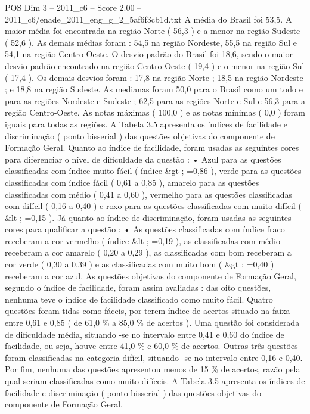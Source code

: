 \begin{textsample}{POS Dim 3 – 2011\_c6 – Score 2.00 – 2011\_c6/enade\_2011\_eng\_g\_2\_5af6f3cb1d.txt}
A média do Brasil foi 53,5.
A maior média foi encontrada na região Norte ( 56,3 ) e a menor na região Sudeste ( 52,6 ).
As demais médias foram : 54,5 na região Nordeste, 55,5 na região Sul e 54,1 na região Centro-Oeste.
O desvio padrão do Brasil foi 18,6, sendo o maior desvio padrão encontrado na região Centro-Oeste ( 19,4 ) e o menor na região Sul ( 17,4 ).
Os demais desvios foram : 17,8 na região Norte ; 18,5 na região Nordeste ; e 18,8 na região Sudeste.
As medianas foram 50,0 para o Brasil como um todo e para as regiões Nordeste e Sudeste ; 62,5 para as regiões Norte e Sul e 56,3 para a região Centro-Oeste.
As notas máximas ( 100,0 ) e as notas mínimas ( 0,0 ) foram iguais para todas as regiões.
A Tabela 3.5 apresenta os índices de facilidade e discriminação ( ponto bisserial ) das questões objetivas do componente de Formação Geral.
Quanto ao índice de facilidade, foram usadas as seguintes cores para diferenciar o nível de dificuldade da questão : • Azul para as questões classificadas com índice muito fácil ( índice \&gt ; =0,86 ), verde para as questões classificadas com índice fácil ( 0,61 a 0,85 ), amarelo para as questões classificadas com médio ( 0,41 a 0,60 ), vermelho para as questões classificadas com difícil ( 0,16 a 0,40 ) e roxo para as questões classificadas com muito difícil ( \&lt ; =0,15 ).
Já quanto ao índice de discriminação, foram usadas as seguintes cores para qualificar a questão : • As questões classificadas com índice fraco receberam a cor vermelho ( índice \&lt ; =0,19 ), as classificadas com médio receberam a cor amarelo ( 0,20 a 0,29 ), as classificadas com bom receberam a cor verde ( 0,30 a 0,39 ) e as classificadas com muito bom ( \&gt ; =0,40 ) receberam a cor azul.
As questões objetivas do componente de Formação Geral, segundo o índice de facilidade, foram assim avaliadas : das oito questões, nenhuma teve o índice de facilidade classificado como muito fácil.
Quatro questões foram tidas como fáceis, por terem índice de acertos situado na faixa entre 0,61 e 0,85 ( de 61,0 \% a 85,0 \% de acertos ).
Uma questão foi considerada de dificuldade média, situando -se no intervalo entre 0,41 e 0,60 do índice de facilidade, ou seja, houve entre 41,0 \% e 60,0 \% de acertos.
Outras três questões foram classificadas na categoria difícil, situando -se no intervalo entre 0,16 e 0,40.
Por fim, nenhuma das questões apresentou menos de 15 \% de acertos, razão pela qual seriam classificadas como muito difíceis.
A Tabela 3.5 apresenta os índices de facilidade e discriminação ( ponto bisserial ) das questões objetivas do componente de Formação Geral.

\end{textsample}
